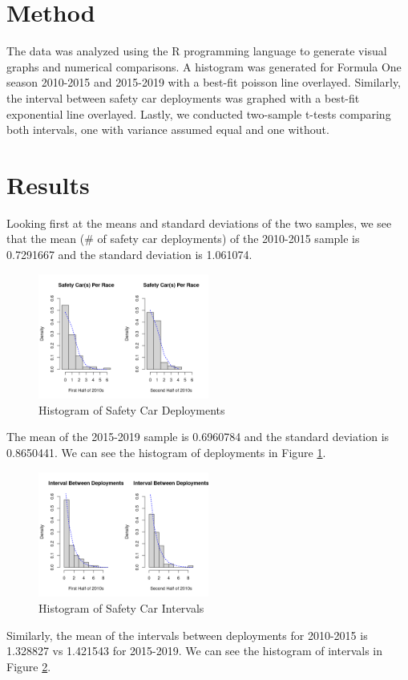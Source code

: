 \documentclass[11pt]{article}
\begin{document}
\section{Method}
The data was analyzed using the R programming language to generate visual graphs and numerical comparisons. A histogram was generated for Formula One season 2010-2015 and 2015-2019 with a best-fit poisson line overlayed.
Similarly, the interval between safety car deployments was graphed with a best-fit exponential line overlayed.
Lastly, we conducted two-sample t-tests comparing both intervals, one with variance assumed equal and one without.

\pagebreak

\section{Results}

Looking first at the means and standard deviations of the two samples, we see that the mean (\# of safety car deployments) of the 2010-2015 sample is 0.7291667 and the standard deviation is 1.061074.

\begin{figure}[h]
    \centering
    \includegraphics[width=0.5\textwidth]{deployment-histogram.png}
    \caption{Histogram of Safety Car Deployments}
    \label{fig:histogram}
\end{figure}

The mean of the 2015-2019 sample is 0.6960784 and the standard deviation is 0.8650441.
We can see the histogram of deployments in Figure \ref{fig:histogram}.

\begin{figure}[h]
    \centering
    \includegraphics[width=0.5\textwidth]{interval-histogram.png}
    \caption{Histogram of Safety Car Intervals}
    \label{fig:interval}
\end{figure}

Similarly, the mean of the intervals between deployments for 2010-2015 is 1.328827 vs 1.421543 for 2015-2019.
We can see the histogram of intervals in Figure \ref{fig:interval}.
\end{document}
